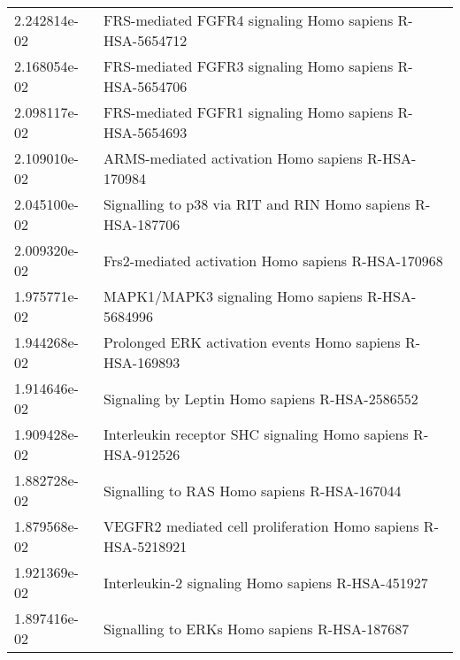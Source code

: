 \begin{longtable}{p{2.4cm}p{14.5cm}}
             2.242814e-02 &                                                                   FRS-mediated FGFR4 signaling Homo sapiens R-HSA-5654712 \\
             2.168054e-02 &                                                                   FRS-mediated FGFR3 signaling Homo sapiens R-HSA-5654706 \\
             2.098117e-02 &                                                                   FRS-mediated FGFR1 signaling Homo sapiens R-HSA-5654693 \\
             2.109010e-02 &                                                                        ARMS-mediated activation Homo sapiens R-HSA-170984 \\
             2.045100e-02 &                                                               Signalling to p38 via RIT and RIN Homo sapiens R-HSA-187706 \\
             2.009320e-02 &                                                                        Frs2-mediated activation Homo sapiens R-HSA-170968 \\
             1.975771e-02 &                                                                          MAPK1/MAPK3 signaling Homo sapiens R-HSA-5684996 \\
             1.944268e-02 &                                                                 Prolonged ERK activation events Homo sapiens R-HSA-169893 \\
             1.914646e-02 &                                                                            Signaling by Leptin Homo sapiens R-HSA-2586552 \\
             1.909428e-02 &                                                              Interleukin receptor SHC signaling Homo sapiens R-HSA-912526 \\
             1.882728e-02 &                                                                               Signalling to RAS Homo sapiens R-HSA-167044 \\
             1.879568e-02 &                                                             VEGFR2 mediated cell proliferation Homo sapiens R-HSA-5218921 \\
             1.921369e-02 &                                                                         Interleukin-2 signaling Homo sapiens R-HSA-451927 \\
             1.897416e-02 &                                                                              Signalling to ERKs Homo sapiens R-HSA-187687 \\

\end{longtable}
